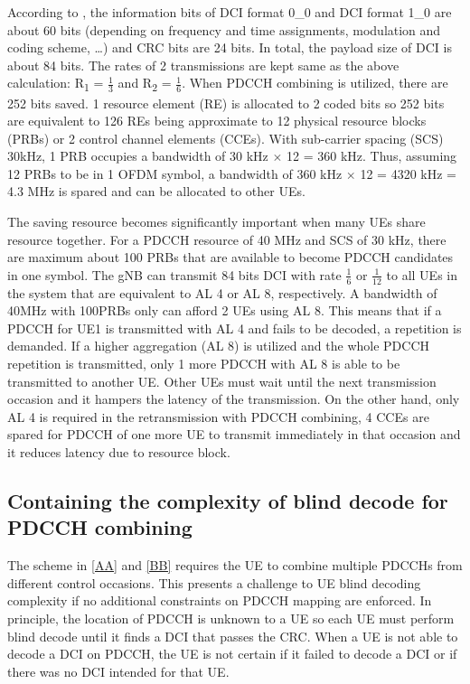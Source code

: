 \documentclass[conference]{IEEEtran}
\begin{document}
According to \cite{b8}, the information bits of DCI format 0\_0 and DCI format 1\_0 are about 60 bits (depending on frequency and time assignments, modulation and coding scheme, …) and CRC bits are 24 bits. In total, the payload size of DCI is about 84 bits. The rates of 2 transmissions are kept same as the above calculation: R\textsubscript{1} = $\frac{1}{3}$ and R\textsubscript{2} = $\frac{1}{6}$. When PDCCH combining is utilized, there are 252 bits saved. 1 resource element (RE) is allocated to 2 coded bits so 252 bits are equivalent to 126 REs being approximate to 12 physical resource blocks (PRBs) or 2 control channel elements (CCEs). With sub-carrier spacing (SCS) 30kHz, 1 PRB occupies a bandwidth of 30 kHz $\times$ 12 = 360 kHz. Thus, assuming 12 PRBs to be in 1 OFDM symbol, a bandwidth of 360 kHz $\times$ 12 = 4320 kHz = 4.3 MHz is spared and can be allocated to other UEs. 

The saving resource becomes significantly important when many UEs share resource together. For a PDCCH resource of 40 MHz and SCS of 30 kHz, there are maximum about 100 PRBs that are available to become PDCCH candidates in one symbol. The gNB can transmit 84 bits DCI with rate $\frac{1}{6}$ or $\frac{1}{12}$ to all UEs in the system that are equivalent to AL 4 or AL 8, respectively. A bandwidth of 40MHz with 100PRBs only can afford 2 UEs using AL 8. This means that if a PDCCH for UE1 is transmitted with AL 4 and fails to be decoded, a repetition is demanded. If a higher aggregation (AL 8) is utilized and the whole PDCCH repetition is transmitted, only 1 more PDCCH with AL 8 is able to be transmitted to another UE. Other UEs must wait until the next transmission occasion and it hampers the latency of the transmission. On the other hand, only AL 4 is required in the retransmission with PDCCH combining, 4 CCEs are spared for PDCCH of one more UE to transmit immediately in that occasion and it reduces latency due to resource block.

\subsection{Containing the complexity of blind decode for PDCCH combining}\label{DD}

The scheme in \ref{AA} and \ref{BB} requires the UE to combine multiple PDCCHs from different control occasions. This presents a challenge to UE blind decoding complexity if no additional constraints on PDCCH mapping are enforced. In principle, the location of PDCCH is unknown to a UE so each UE must perform blind decode until it finds a DCI that passes the CRC. When a UE is not able to decode a DCI on PDCCH, the UE is not certain if it failed to decode a DCI or if there was no DCI intended for that UE. 
\end{document}
